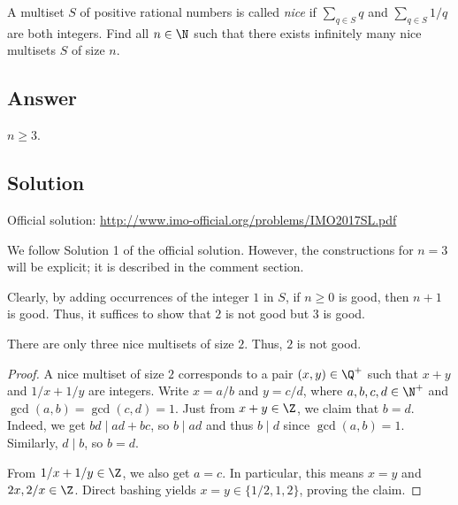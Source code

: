 A multiset $S$ of positive rational numbers is called \emph{nice} if $\sum_{q \in S} q$ and $\sum_{q \in S} 1/q$ are both integers.
Find all $n \in \N$ such that there exists infinitely many nice multisets $S$ of size $n$.



\subsection*{Answer}

$n \geq 3$.



\subsection*{Solution}

Official solution: \url{http://www.imo-official.org/problems/IMO2017SL.pdf}

We follow Solution 1 of the official solution.
However, the constructions for $n = 3$ will be explicit; it is described in the comment section.

Clearly, by adding occurrences of the integer $1$ in $S$, if $n \geq 0$ is good, then $n + 1$ is good.
Thus, it suffices to show that $2$ is not good but $3$ is good.

\begin{claim}
There are only three nice multisets of size $2$.
Thus, $2$ is not good.
\end{claim}
\begin{proof}
A nice multiset of size $2$ corresponds to a pair $(x, y) \in \Q^+$ such that $x + y$ and $1/x + 1/y$ are integers.
Write $x = a/b$ and $y = c/d$, where $a, b, c, d \in \N^+$ and $\gcd(a, b) = \gcd(c, d) = 1$.
Just from $x + y \in \Z$, we claim that $b = d$.
Indeed, we get $bd \mid ad + bc$, so $b \mid ad$ and thus $b \mid d$ since $\gcd(a, b) = 1$.
Similarly, $d \mid b$, so $b = d$.

From $1/x + 1/y \in \Z$, we also get $a = c$.
In particular, this means $x = y$ and $2x, 2/x \in \Z$.
Direct bashing yields $x = y \in \{1/2, 1, 2\}$, proving the claim.
\end{proof}

